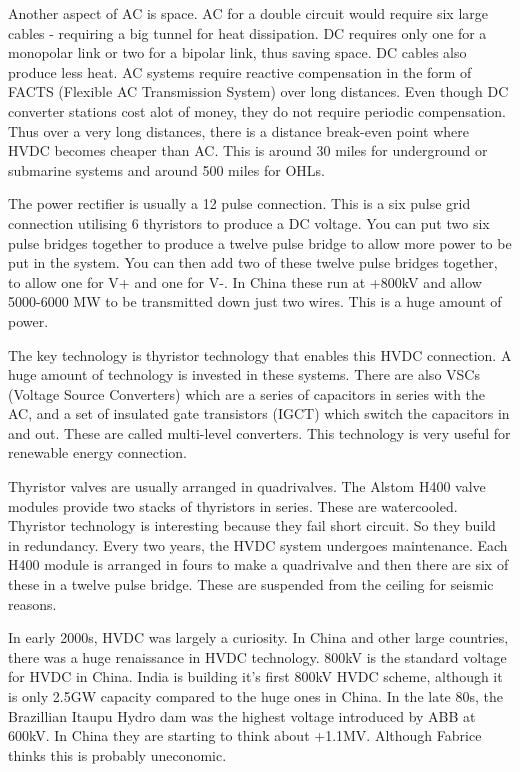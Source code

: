 Another aspect of AC is space. 
AC for a double circuit would require six large cables - requiring a big tunnel for heat dissipation. 
DC requires only one for a monopolar link or two for a bipolar link, thus saving space. 
DC cables also produce less heat.
AC systems require reactive compensation in the form of FACTS (Flexible AC Transmission System) over long distances. 
Even though DC converter stations cost alot of money, they do not require periodic compensation. 
Thus over a very long distances, there is a distance break-even point where HVDC becomes cheaper than AC. 
This is around 30 miles for underground or submarine systems and around 500 miles for OHLs.

The power rectifier is usually a 12 pulse connection. 
This is a six pulse grid connection utilising 6 thyristors to produce a DC voltage. 
You can put two six pulse bridges together to produce a twelve pulse bridge to allow more power to be put in the system. 
You can then add two of these twelve pulse bridges together, to allow one for V+ and one for V-. 
In China these run at +\-800kV and allow 5000-6000 MW to be transmitted down just two wires. 
This is a huge amount of power.

The key technology is thyristor technology that enables this HVDC connection. 
A huge amount of technology is invested in these systems. 
There are also VSCs (Voltage Source Converters) which are a series of capacitors in series with the AC, and a set of insulated gate transistors (IGCT) which switch the capacitors in and out. 
These are called multi-level converters. 
This technology is very useful for renewable energy connection.

Thyristor valves are usually arranged in quadrivalves. 
The Alstom H400 valve modules provide two stacks of thyristors in series. 
These are watercooled. 
Thyristor technology is interesting because they fail short circuit. 
So they build in redundancy.
 Every two years, the HVDC system undergoes maintenance. 
Each H400 module is arranged in fours to make a quadrivalve and then there are six of these in a twelve pulse bridge. 
These are suspended from the ceiling for seismic reasons.

In early 2000s, HVDC was largely a curiosity. 
In China and other large countries, there was a huge renaissance in HVDC technology. 
800kV is the standard voltage for HVDC in China. 
India is building it's first 800kV HVDC scheme, although it is only 2.5GW capacity compared to the huge ones in China. 
In the late 80s, the Brazillian Itaupu Hydro dam was the highest voltage introduced by ABB at 600kV. 
In China they are starting to think about +\-1.1MV. 
Although Fabrice thinks this is probably uneconomic.

